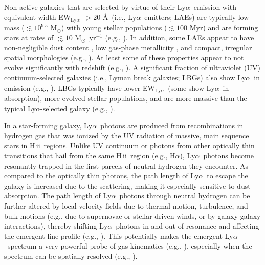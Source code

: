 \documentclass{emulateapj}
\newcommand{\lya}{Ly$\alpha$}
\newcommand{\ha}{H$\alpha$}
\newcommand{\msun}{\mbox{M$_{\odot}$}}
\def\ewlya{EW$_{\mathrm{Ly}\alpha}$}
\def\hii{H\,{\sc ii}}
\begin{document}
Non-active galaxies that are selected by virtue of their \lya\ emission with equivalent width \ewlya\ $> 20$ \AA\ (i.e., \lya\ emitters; LAEs) are typically low-mass ($\lesssim10^{9.5}$ \msun) with young stellar populations ($\lesssim100$ Myr) and are forming stars at rates of $\lesssim10$ \msun\ yr$^{-1}$ (e.g., \citealp{venemans2005,gawiser2006,finkelstein2007,ono2010,acquaviva2011}). In addition, some LAEs appear to have non-negligible dust content \citep{finkelstein2009,pentericci2009}, low gas-phase metallicity \citep{finkelstein2011,nakajima2013}, and compact, irregular spatial morphologies (e.g., \citealp{venemans2005,gronwall2011,bond2012}). At least some of these properties appear to not evolve significantly with redshift (e.g., \citealp{ouchi2008,blanc2011,mallery2012}). A significant fraction of ultraviolet (UV) continuum-selected galaxies (i.e., Lyman break galaxies; LBGs) also show \lya\ in emission (e.g., \citealp{shapley2003,kornei2010,stark2010,kulas2012,ono2012,berry2012}). LBGs typically have lower \ewlya\ (some show \lya\ in absorption), more evolved stellar populations, and are more massive than the typical \lya-selected galaxy (e.g., \citealp{gawiser2006,pentericci2007,yuma2010}).

In a star-forming galaxy, \lya\ photons are produced from recombinations in hydrogen gas that was ionized by the UV radiation of massive, main sequence stars in \hii\ regions. Unlike UV continuum or photons from other optically thin transitions that hail from the same \hii\ region (e.g., \ha), \lya\ photons become resonantly trapped in the first parcels of neutral hydrogen they encounter. As compared to the optically thin photons, the path length of \lya\ to escape the galaxy is increased due to the scattering, making it especially sensitive to dust absorption. The path length of \lya\ photons through neutral hydrogen can be further altered by local velocity fields due to thermal motion, turbulence, and bulk motions (e.g., due to supernovae or stellar driven winds, or by galaxy-galaxy interactions), thereby shifting \lya\ photons in and out of resonance and affecting the emergent line profile (e.g., \citealp{verhamme2006}). This potentially makes the emergent \lya\ spectrum a very powerful probe of gas kinematics (e.g., \citealp{verhamme2008,yang2011,kulas2012}), especially when the spectrum can be spatially resolved (e.g., \citealp{rauch2011}).
\end{document}
